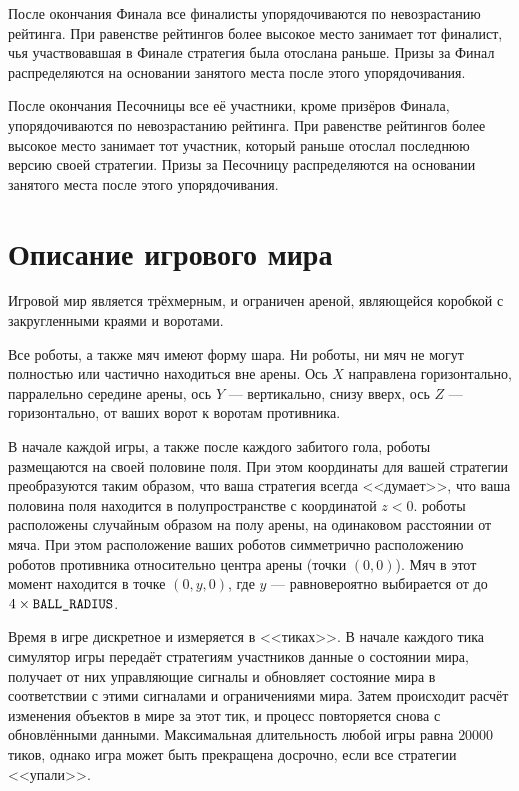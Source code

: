 После окончания Финала все финалисты упорядочиваются по невозрастанию рейтинга.
При равенстве рейтингов более высокое место занимает тот финалист,
чья участвовавшая в Финале стратегия была отослана раньше.
Призы за Финал распределяются на основании занятого места после этого
упорядочивания.

После окончания Песочницы все её участники, кроме призёров Финала, упорядочиваются по невозрастанию рейтинга.
При равенстве рейтингов более высокое место занимает тот участник,
который раньше отослал последнюю версию своей стратегии.
Призы за Песочницу распределяются на основании занятого места после этого упорядочивания.

\section{Описание игрового мира}

Игровой мир является трёхмерным, и ограничен ареной, являющейся коробкой с закругленными краями и воротами.

Все роботы, а также мяч имеют форму шара. Ни роботы, ни мяч не могут полностью или частично находиться вне арены.
Ось $X$ направлена горизонтально, парралельно середине арены,
ось $Y$ --- вертикально, снизу вверх,
ось $Z$ --- горизонтально, от ваших ворот к воротам противника.

В начале каждой игры, а также после каждого забитого гола, роботы размещаются на своей половине поля.
При этом координаты для вашей стратегии преобразуются таким образом, что ваша стратегия всегда <<думает>>,
что ваша половина поля находится в полупространстве с координатой $z < 0$.
роботы расположены случайным образом на полу арены, на одинаковом расстоянии от мяча.
При этом расположение ваших роботов симметрично расположению роботов противника относительно центра арены (точки $(0, 0)$).
Мяч в этот момент находится в точке $(0, y, 0)$, где $y$ ---
равновероятно выбирается от  до $4\times\texttt{BALL\_RADIUS}$.

Время в игре дискретное и измеряется в <<тиках>>.
В начале каждого тика симулятор игры передаёт стратегиям участников данные о состоянии мира,
получает от них управляющие сигналы и обновляет состояние мира в соответствии с этими сигналами и ограничениями мира.
Затем происходит расчёт изменения объектов в мире за этот тик, и процесс повторяется снова с обновлёнными данными.
Максимальная длительность любой игры равна $20000$ тиков, однако игра может быть прекращена досрочно, если все стратегии <<упали>>.

